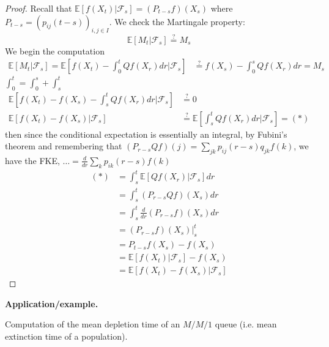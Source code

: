 \documentclass[10pt,a4paper]{article}
\theoremstyle{definition}
\newcommand{\questeq}{\stackrel{?}{=}}
\begin{document}
\begin{proof}
	Recall that $\mathbb{E}[ f( X_{t}) |\mathcal{F}_{s}] =( P_{t-s} f)( X_{s})$ where $P_{t-s} =( p_{ij}( t-s))_{i,j\in I}$. We check the Martingale property:
	\begin{equation*}
		\mathbb{E}[ M_{t} |\mathcal{F}_{s}] \questeq M_{s}
	\end{equation*}
	We begin the computation
	\begin{align*}
		\mathbb{E}[ M_{t} |\mathcal{F}_{s}] =\mathbb{E}\left[ f( X_{t}) -\int _{0}^{t} Qf( X_{r}) dr|\mathcal{F}_{s}\right] & \questeq f( X_{s}) -\int _{0}^{s} Qf( X_{r}) dr=M_{s} 
	\end{align*}
	$\int _{0}^{t} =\int _{0}^{s} +\int _{s}^{t}$
	\begin{align*}
		\mathbb{E}\left[ f( X_{t}) -f( X_{s}) -\int _{s}^{t} Qf( X_{r}) dr|\mathcal{F}_{s}\right] & \questeq 0                                                                        \\
		\mathbb{E}[ f( X_{t}) -f( X_{s}) |\mathcal{F}_{s}]                                        & \questeq\mathbb{E}\left[\int _{s}^{t} Qf( X_{r}) dr|\mathcal{F}_{s}\right] =( *) 
	\end{align*}
	then since the conditional expectation is essentially an integral, by Fubini's theorem and remembering that $( P_{r-s} Qf)( j) =\sum _{jk} p_{ij}( r-s) q_{jk} f( k)$, we have the FKE, $\dotsc =\frac{d}{dr}\sum _{k} p_{ik}( r-s) f( k)$
	\begin{align*}
		( *) & =\int _{s}^{t}\mathbb{E}[ Qf( X_{r}) |\mathcal{F}_{s}] dr \\
		     & =\int _{s}^{t}( P_{r-s} Qf)( X_{s}) dr                    \\
		     & =\int _{s}^{t}\frac{d}{dr}( P_{r-s} f)( X_{s}) dr         \\
		     & =( P_{r-s} f)( X_{s}) |_{s}^{t}                           \\
		     & =P_{t-s} f( X_{s}) -f( X_{s})                             \\
		     & =\mathbb{E}[ f( X_{t}) |\mathcal{F}_{s}] -f( X_{s})       \\
		     & =\mathbb{E}[ f( X_{t}) -f( X_{s}) |\mathcal{F}_{s}]
	\end{align*}
\end{proof}
\textbf{Application/example.}

Computation of the mean depletion time of an $M/M/1$ queue (i.e. mean extinction time of a population).
\end{document}
